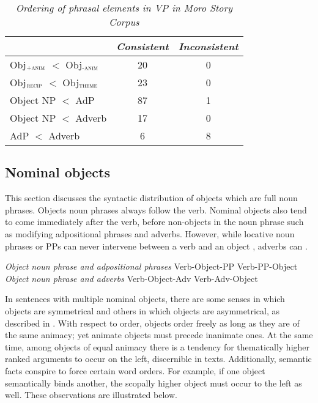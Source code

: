\begin{table}
\caption{\textit{Ordering of phrasal elements in VP in Moro Story Corpus}}
\begin{tabular}{lcc}
\toprule 
& \textit{Consistent} & \textit{Inconsistent} \\
\midrule 
Obj$_{\textsc{+anim}}$ $<$ Obj$_{\textsc{-anim}}$ &  20 & 0 \\
Obj$_{\textsc{recip}}$ $<$ Obj$_{\textsc{theme}}$ & 23 & 0  \\
Object NP $<$ AdP &  87 & 1 \\
Object NP $<$ Adverb  & 17 & 0 \\	
AdP $<$ Adverb & 6 & 8 \\	
\bottomrule
\end{tabular}	\label{tab:ch12:vporder}
\end{table}






\subsection{Nominal objects}\label{sec:ch12:objnoun}

This section discusses the syntactic distribution of objects which are full noun phrases. Objects noun phrases always follow the verb. Nominal objects also tend to come immediately after the verb, before non-objects in the noun phrase such as modifying adpositional phrases and adverbs. However, while locative noun phrases or PPs can never intervene between a verb and an object , adverbs can .

\ea \textit{Object noun phrase and adpositional phrases}
	\ea Verb-Object-PP
	\ex Verb-PP-Object\label{ex:ch12:ppobj}
	\z 
\ex \textit{Object noun phrase and adverbs}
	\ea Verb-Object-Adv
	\ex Verb-Adv-Object
	\z 
\z

In sentences with multiple nominal objects, there are some senses in which objects are symmetrical and others in which objects are asymmetrical, as described in \citet{Ackerman:2015}. With respect to order, objects order freely as long as they are of the same animacy; yet animate objects must precede inanimate ones.  At the same time, among objects of equal animacy there is a tendency for thematically higher ranked arguments to occur on the left, discernible in texts. Additionally, semantic facts conspire to force certain word orders. For example, if one object semantically binds another, the scopally higher object must occur to the left as well. These observations are illustrated below.

